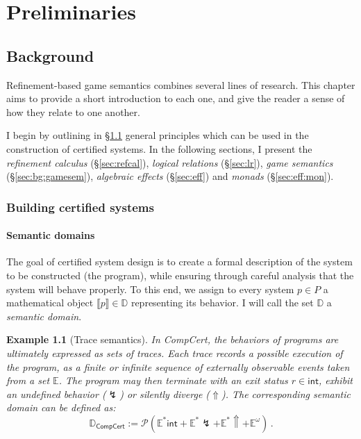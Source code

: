 \documentclass[11pt,oneside,draft]{book}
\newtheorem{example}[theorem]{Example}
\theoremstyle{definition}
\newcommand{\kw}[1]{\ensuremath{ \mathsf{#1} }}
\begin{document}



\part{Preliminaries} \label{part:prelim}

\chapter{Background} %

Refinement-based game semantics combines
several lines of research.
This chapter aims to provide a short introduction to each one,
and give the reader a sense of how they relate to one another.

I begin
by outlining in \S\ref{sec:principles} general principles
which can be used in the construction of certified systems.
In the following sections,
I present
the \emph{refinement calculus} (\S\ref{sec:refcal}),
\emph{logical relations} (\S\ref{sec:lr}),
\emph{game semantics} (\S\ref{sec:bg:gamesem}),
\emph{algebraic effects} (\S\ref{sec:eff}) and
\emph{monads} (\S\ref{sec:eff:mon}).

\section{Building certified systems} \label{sec:principles} %

\subsection{Semantic domains} %

The goal of certified system design is
to create a formal description of
the system to be constructed (the program),
while ensuring
through careful analysis
that the system
will behave properly.
To this end,
we assign
to every system $p \in P$
a mathematical object $\llbracket p \rrbracket \in \mathbb{D}$
representing its behavior.
I will call the set $\mathbb{D}$ a \emph{semantic domain}.

\begin{example}[Trace semantics] \label{ex:trsem} %
In CompCert,
the behaviors of programs are ultimately expressed
as sets of traces.
Each trace records a possible execution of the program,
as a finite or infinite sequence of externally observable events
taken from a set $\mathbb{E}$.
The program may then
terminate with an exit status $r \in \kw{int}$,
exhibit an undefined behavior ($\lightning$)
or silently diverge ($\Uparrow$).
The corresponding semantic domain can be defined as:
\[
  \mathbb{D}_\kw{CompCert} :=
    \mathcal{P}
      (\mathbb{E}^*\kw{int} +
       \mathbb{E}^*{\lightning} +
       \mathbb{E}^*{\Uparrow} +
       \mathbb{E}^\omega)
  \,.
\]
\end{example}
\end{document}
